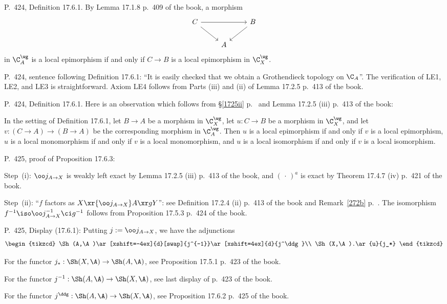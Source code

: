 \documentclass[12pt]{article}
\theoremstyle{remark}
\theoremstyle{definition}
\begin{document}
\begin{s}
P.~424, Definition 17.6.1. By Lemma 17.1.8 p.~409 of the book, a morphism 
$$
\begin{tikzcd} 
C\ar{rr}\ar{dr}&&B\ar{dl}\\ 
{}&A
\end{tikzcd}
$$ 
in $\C_A^\wg$ is a local epimorphism if and only if $C\to B$ is a local epimorphism in $\C_X^\wg$.
\end{s}

%

\begin{s}
P.~424, sentence following Definition 17.6.1: ``It is easily checked that we obtain a Grothendieck topology on $\C_A$''. The verification  of LE1, LE2, and LE3 is straightforward. Axiom LE4 follows from Parts (iii) and (ii) of Lemma 17.2.5 p.~413 of the book.
\end{s} 

%

\begin{s} 
P.~424, Definition 17.6.1. Here is an observation which follows from \S\ref{1725ii} p.~ and Lemma 17.2.5 (iii) p.~413 of the book: 

In the setting of Definition 17.6.1, let $B\to A$ be a morphism in $\C_X^\wg$, let $u:C\to B$ be a morphism in $\C_X^\wg$, and let $v:(C\to A)\to(B\to A)$ be the corresponding morphism in $\C_A^\wg$. Then $u$ is a local epimorphism if and only if $v$ is a local epimorphism, $u$ is a local monomorphism if and only if $v$ is a local monomorphism, and $u$ is a local isomorphism if and only if $v$ is a local isomorphism. 
\end{s} 

%

\begin{s}
P.~425, proof of Proposition 17.6.3: 

Step~(i): $\oo j_{A\to X}$ is weakly left exact by Lemma 17.2.5 (iii) p.~413 of the book, and $(\,\cdot\,)^a$ is exact by Theorem 17.4.7 (iv) p.~421 of the book.

Step~(ii): ``$f$ factors as $X\xr{\oo j_{A\to X}}A\xr gY$'': see Definition 17.2.4 (ii) p.~413 of the book and Remark~\ref{272b} p.~. The isomorphism $f^{-1}\iso\oo j_{A\to X}^{-1}\ci g^{-1}$ follows from Proposition 17.5.3 p.~424 of the book.
\end{s} 

% 

\begin{s} 
P.~425, Display (17.6.1): Putting $j:=\oo j_{A\to X}$, we have the adjunctions 
$$
\begin{tikzcd}
\Sh(A,\A)\ar[xshift=-4ex]{d}[swap]{j^{-1}}\ar[xshift=4ex]{d}{j^\ddg}\\ 
\Sh(X,\A).\ar{u}{j_*}
\end{tikzcd}
$$ 

For the functor $j_*:\Sh(X,\A)\to\Sh(A,\A)$, see Proposition 17.5.1 p.~423 of the book. 

For the functor $j^{-1}:\Sh(A,\A)\to\Sh(X,\A)$, see last display of p.~423 of the book. 

For the functor $j^\ddg:\Sh(A,\A)\to\Sh(X,\A)$, see Proposition 17.6.2 p.~425 of the book.
\end{s}
\end{document}
